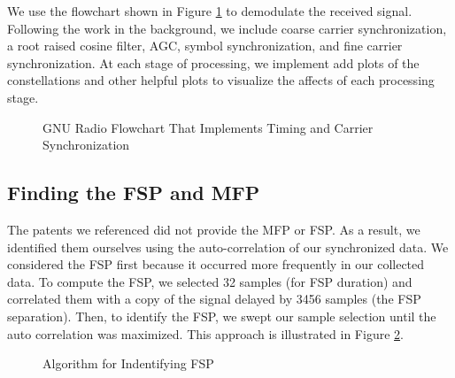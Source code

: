\documentclass[conference,onecolumn]{IEEEtran}
\begin{document}
We use the flowchart shown in Figure \ref{fig::timing_carrier_sync} to demodulate the received signal. Following the work in the background, we include coarse carrier synchronization, a root raised cosine filter, AGC, symbol synchronization, and fine carrier synchronization. At each stage of processing, we implement add plots of the constellations and other helpful plots to visualize the affects of each processing stage. 

\begin{figure}[H]
	\centerline{}
	\caption{GNU Radio Flowchart That Implements Timing and Carrier Synchronization}
	\label{fig::timing_carrier_sync}
\end{figure}

\subsection{Finding the FSP and MFP}

The patents we referenced did not provide the MFP or FSP. As a result, we identified them ourselves using the auto-correlation of our synchronized data. We considered the FSP first because it occurred more frequently in our collected data. To compute the FSP, we selected 32 samples (for FSP duration) and correlated them with a copy of the signal delayed by 3456 samples (the FSP separation). Then, to identify the FSP, we swept our sample selection until the auto correlation was maximized. This approach is illustrated in Figure \ref{fig::finding_fsp}.

\begin{figure}[H]
	\centerline{}
	\caption{Algorithm for Indentifying FSP}
	\label{fig::finding_fsp}
\end{figure}
\end{document}
